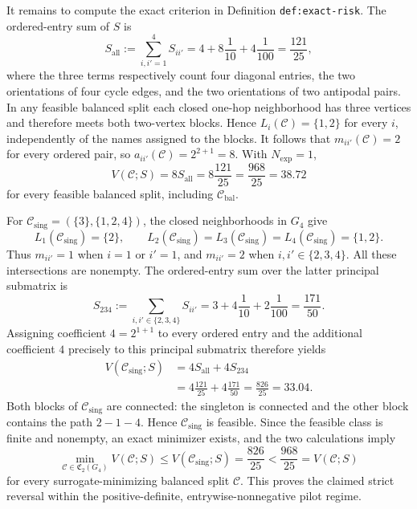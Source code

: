 It remains to compute the exact criterion in Definition \texttt{def:exact-risk}.  The ordered-entry sum of \(S\) is
\[
S_{\mathrm{all}}:=\sum_{i,i'=1}^4 S_{ii'}
=4+8\frac{1}{10}+4\frac{1}{100}
=\frac{121}{25},
\]
where the three terms respectively count four diagonal entries, the two orientations of four cycle edges, and the two orientations of two antipodal pairs.  In any feasible balanced split each closed one-hop neighborhood has three vertices and therefore meets both two-vertex blocks.  Hence \(L_i(\mathcal C)=\{1,2\}\) for every \(i\), independently of the names assigned to the blocks.  It follows that \(m_{ii'}(\mathcal C)=2\) for every ordered pair, so \(a_{ii'}(\mathcal C)=2^{2+1}=8\).  With \(N_{\exp}=1\),
\[
V(\mathcal C;S)=8S_{\mathrm{all}}
=8\frac{121}{25}
=\frac{968}{25}=38.72
\]
for every feasible balanced split, including \(\mathcal C_{\mathrm{bal}}\).

For \(\mathcal C_{\mathrm{sing}}=(\{3\},\{1,2,4\})\), the closed neighborhoods in \(G_4\) give
\[
L_1(\mathcal C_{\mathrm{sing}})=\{2\},
\qquad
L_2(\mathcal C_{\mathrm{sing}})
=L_3(\mathcal C_{\mathrm{sing}})
=L_4(\mathcal C_{\mathrm{sing}})=\{1,2\}.
\]
Thus \(m_{ii'}=1\) when \(i=1\) or \(i'=1\), and \(m_{ii'}=2\) when \(i,i'\in\{2,3,4\}\).  All these intersections are nonempty.  The ordered-entry sum over the latter principal submatrix is
\[
S_{234}:=\sum_{i,i'\in\{2,3,4\}}S_{ii'}
=3+4\frac{1}{10}+2\frac{1}{100}
=\frac{171}{50}.
\]
Assigning coefficient \(4=2^{1+1}\) to every ordered entry and the additional coefficient \(4\) precisely to this principal submatrix therefore yields
\[
\begin{aligned}
V(\mathcal C_{\mathrm{sing}};S)
&=4S_{\mathrm{all}}+4S_{234}\\
&=4\frac{121}{25}+4\frac{171}{50}
=\frac{826}{25}=33.04.
\end{aligned}
\]
Both blocks of \(\mathcal C_{\mathrm{sing}}\) are connected: the singleton is connected and the other block contains the path \(2-1-4\).  Hence \(\mathcal C_{\mathrm{sing}}\) is feasible.  Since the feasible class is finite and nonempty, an exact minimizer exists, and the two calculations imply
\[
\min_{\mathcal C\in\mathfrak C_2(G_4)}V(\mathcal C;S)
\le V(\mathcal C_{\mathrm{sing}};S)
=\frac{826}{25}
<\frac{968}{25}
=V(\mathcal C;S)
\]
for every surrogate-minimizing balanced split \(\mathcal C\).  This proves the claimed strict reversal within the positive-definite, entrywise-nonnegative pilot regime.
